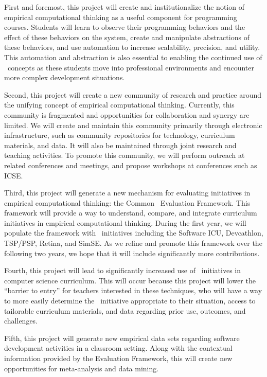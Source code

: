 First and foremost, this project will create and institutionalize the
notion of empirical computational thinking as a useful component for
programming courses.  Students will learn to observe their programming
behaviors and the effect of these behaviors on the system, create and
manipulate abstractions of these behaviors, and use automation to increase
scalability, precision, and utility.  This automation and abstraction is also
essential to enabling the continued use of \eCT\ concepts as these students
move into professional environments and encounter more complex development
situations.

Second, this project will create a new community of research and practice
around the unifying concept of empirical computational thinking.
Currently, this community is fragmented and opportunities for collaboration
and synergy are limited.  We will create and maintain this community
primarily through electronic infrastructure, such as community repositories
for technology, curriculum materials, and data.  It will also be maintained
through joint research and teaching activities.  To promote this community,
we will perform outreach at related conferences and meetings, and propose
workshops at conferences such as ICSE.

Third, this project will generate a new mechanism for evaluating initiatives
in empirical computational thinking: the Common \eCT\ Evaluation
Framework.  This framework will provide a way to understand, compare, and
integrate curriculum initiatives in empirical computational thinking.
During the first year, we will populate the framework with \eCT\
initiatives including the Software ICU, Devcathlon, TSP/PSP, Retina, and
SimSE.  As we refine and promote this framework over the following two
years, we hope that it will include significantly more contributions.

Fourth, this project will lead to significantly increased use of \eCT\
initiatives in computer science curriculum.  This will occur because this
project will lower the ``barrier to entry'' for teachers interested in
these techniques, who will have a way to more easily determine the \eCT\
initiative appropriate to their situation, access to tailorable curriculum
materials, and data regarding prior use, outcomes, and challenges.

Fifth, this project will generate new empirical data sets regarding
software development activities in a classroom setting.  Along with the
contextual information provided by the Evaluation Framework, this will
create new opportunities for meta-analysis and data mining.  


